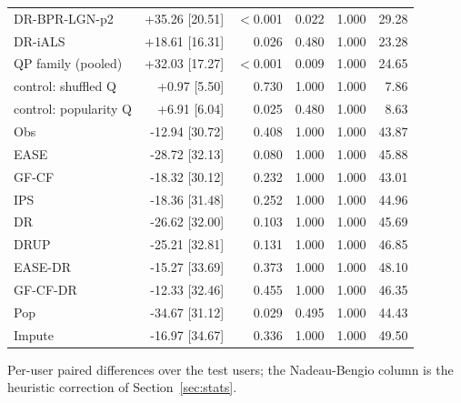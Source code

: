 \begin{table}[htbp]
{\begin{tabular}{lrrrrr}
DR-BPR-LGN-p2 & +35.26 [20.51] & $<$0.001 & 0.022 & 1.000 & 29.28 \\
DR-iALS & +18.61 [16.31] & 0.026 & 0.480 & 1.000 & 23.28 \\
QP family (pooled) & +32.03 [17.27] & $<$0.001 & 0.009 & 1.000 & 24.65 \\
control: shuffled Q & +0.97 [5.50] & 0.730 & 1.000 & 1.000 & 7.86 \\
control: popularity Q & +6.91 [6.04] & 0.025 & 0.480 & 1.000 & 8.63 \\
Obs & -12.94 [30.72] & 0.408 & 1.000 & 1.000 & 43.87 \\
EASE & -28.72 [32.13] & 0.080 & 1.000 & 1.000 & 45.88 \\
GF-CF & -18.32 [30.12] & 0.232 & 1.000 & 1.000 & 43.01 \\
IPS & -18.36 [31.48] & 0.252 & 1.000 & 1.000 & 44.96 \\
DR & -26.62 [32.00] & 0.103 & 1.000 & 1.000 & 45.69 \\
DRUP & -25.21 [32.81] & 0.131 & 1.000 & 1.000 & 46.85 \\
EASE-DR & -15.27 [33.69] & 0.373 & 1.000 & 1.000 & 48.10 \\
GF-CF-DR & -12.33 [32.46] & 0.455 & 1.000 & 1.000 & 46.35 \\
Pop & -34.67 [31.12] & 0.029 & 0.495 & 1.000 & 44.43 \\
Impute & -16.97 [34.67] & 0.336 & 1.000 & 1.000 & 49.50 \\
\bottomrule
\end{tabular}}
\par\smallskip\raggedright\footnotesize Per-user paired differences over the test users; the Nadeau-Bengio column is the heuristic correction of Section~\ref{sec:stats}.
\end{table}

